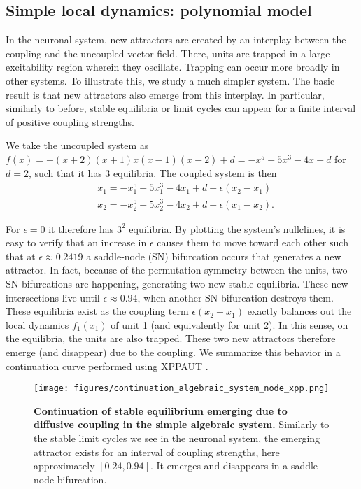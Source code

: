 \subsection*{Simple local dynamics: polynomial model}
In the neuronal system, new attractors are created by an interplay between the coupling and the uncoupled vector field. There, units are trapped in a large excitability region wherein they oscillate. Trapping can occur more broadly in other systems. To illustrate this, we study a much simpler system. The basic result is that new attractors also emerge from this interplay. In particular, similarly to before, stable equilibria or limit cycles can appear for a finite interval of positive coupling strengths.

We take the uncoupled system as $f(x) = -(x+2)(x+1)x(x-1)(x-2) + d = -x^5 + 5x^3 - 4x + d$ for $d = 2$, such that it has 3 equilibria. The coupled system is then
%
\begin{align}
    &\dot{x}_1 = -x_1^5 + 5x_1^3 - 4x_1 + d + \epsilon (x_2 - x_1)\\
    &\dot{x}_2 = -x_2^5 + 5x_2^3 - 4x_2 + d + \epsilon (x_1 - x_2).
\end{align}

For $\epsilon=0$ it therefore has $3^2$ equilibria. By plotting the system's nullclines, it is easy to verify that an increase in $\epsilon$ causes them to move toward each other such that at $\epsilon\approx 0.2419$ a saddle-node (SN) bifurcation occurs that generates a new attractor. In fact, because of the permutation symmetry between the units, two SN bifurcations are happening, generating two new stable equilibria. These new intersections live until $\epsilon \approx 0.94$, when another SN bifurcation destroys them. These equilibria exist as the coupling term $\epsilon(x_2-x_1)$ exactly balances out the local dynamics $f_1(x_1)$ of unit 1 (and equivalently for unit 2). In this sense, on the equilibria, the units are also trapped. These two new attractors therefore emerge (and disappear) due to the coupling. 
We summarize this behavior in a continuation curve performed using XPPAUT \cite{ermentrout2002simulating}.
%
\begin{figure}[h!]
    \centering
    \texttt{[image: figures/continuation\_algebraic\_system\_node\_xpp.png]}
    \caption{\textbf{Continuation of stable equilibrium emerging due to diffusive coupling in the simple algebraic system.} Similarly to the stable limit cycles we see in the neuronal system, the emerging attractor exists for an interval of coupling strengths, here approximately $[0.24, 0.94]$. It emerges and disappears in a saddle-node bifurcation. }
    \label{fig:cont-lc-rotated-shifted}
\end{figure}

